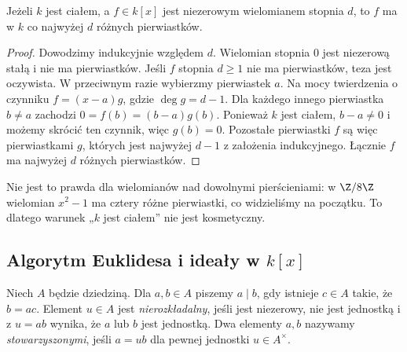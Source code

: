 \begin{twierdzenie}
\label{tw:korzenie}
Jeżeli $k$ jest ciałem, a $f\in k[x]$ jest niezerowym wielomianem
stopnia $d$, to $f$ ma w $k$ co najwyżej $d$ różnych pierwiastków.
\end{twierdzenie}
\begin{proof}
Dowodzimy indukcyjnie względem $d$.
Wielomian stopnia $0$ jest niezerową stałą i nie ma pierwiastków.
Jeśli $f$ stopnia $d\ge1$ nie ma pierwiastków, teza jest oczywista.
W przeciwnym razie wybierzmy pierwiastek $a$.
Na mocy twierdzenia o czynniku $f=(x-a)g$, gdzie $\deg g=d-1$.
Dla każdego innego pierwiastka $b\ne a$ zachodzi
$0=f(b)=(b-a)g(b)$.
Ponieważ $k$ jest ciałem, $b-a\ne0$ i możemy skrócić ten czynnik,
więc $g(b)=0$. Pozostałe pierwiastki $f$ są więc pierwiastkami $g$,
których jest najwyżej $d-1$ z założenia indukcyjnego.
Łącznie $f$ ma najwyżej $d$ różnych pierwiastków.
\end{proof}

\begin{uwaga}
Nie jest to prawda dla wielomianów nad dowolnymi pierścieniami:
w $\Z/8\Z$ wielomian $x^2-1$ ma cztery różne pierwiastki,
co widzieliśmy na początku. To dlatego warunek „$k$ jest ciałem”
nie jest kosmetyczny.
\end{uwaga}

\subsection{Algorytm Euklidesa i ideały w \texorpdfstring{$k[x]$}{k[x]}}

\begin{definicja}
Niech $A$ będzie dziedziną. Dla $a,b\in A$ piszemy $a\mid b$,
gdy istnieje $c\in A$ takie, że $b=ac$.
Element $u\in A$ jest \emph{nierozkładalny}, jeśli jest niezerowy,
nie jest jednostką i z $u=ab$ wynika, że $a$ lub $b$ jest jednostką.
Dwa elementy $a,b$ nazywamy \emph{stowarzyszonymi}, jeśli
$a=ub$ dla pewnej jednostki $u\in A^\times$.
\end{definicja}

